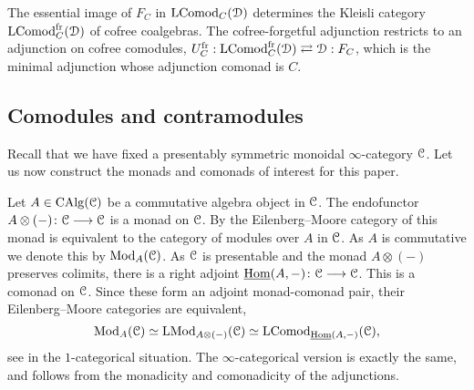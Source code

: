 \begin{remark}
    The essential image of $F_C$ in $\mathrm{LComod}_C(\EuScript{D})$ determines the Kleisli category $\mathrm{LComod}_C^{\mathrm{fr}}(\EuScript{D})$ of cofree coalgebras. The cofree-forgetful adjunction restricts to an adjunction on cofree comodules, $U_C^{\mathrm{fr}} : \mathrm{LComod}_C^{\mathrm{fr}}(\EuScript{D})\rightleftarrows \EuScript{D}: F_C$, which is the minimal adjunction whose adjunction comonad is $C$. 
\end{remark}


\subsection{Comodules and contramodules}

Recall that we have fixed a presentably symmetric monoidal $\infty$-category $\EuScript{C}$. Let us now construct the monads and comonads of interest for this paper. 

\begin{example}
    \label{ch2:ex:algebra-module-monad}
    Let $A\in \operatorname{CAlg}(\EuScript{C})$ be a commutative algebra object in $\EuScript{C}$. The endofunctor $A\otimes(-)\colon\EuScript{C}\longrightarrow \EuScript{C}$ is a monad on $\EuScript{C}$. By \cite[1.17]{christ_2023} the Eilenberg--Moore category of this monad is equivalent to the category of modules over $A$ in $\EuScript{C}$. As $A$ is commutative we denote this by $\mathrm{Mod}_A(\EuScript{C})$. As $\EuScript{C}$ is presentable and the monad $A\otimes(-)$ preserves colimits, there is a right adjoint $\operatorname{\underline{Hom}}(A,-)\colon\EuScript{C}\longrightarrow \EuScript{C}$. This is a comonad on $\EuScript{C}$. Since these form an adjoint monad-comonad pair, their Eilenberg--Moore categories are equivalent,
    \[\mathrm{Mod}_A(\EuScript{C})\simeq \mathrm{LMod}_{A\otimes(-)}(\EuScript{C})\simeq \mathrm{LComod}_{\operatorname{\underline{Hom}}(A,-)}(\EuScript{C}),\]
    see \cite[V.8.2]{maclane-moerdijk_1994} in the $1$-categorical situation. The $\infty$-categorical version is exactly the same, and follows from the monadicity and comonadicity of the adjunctions. 
\end{example}


